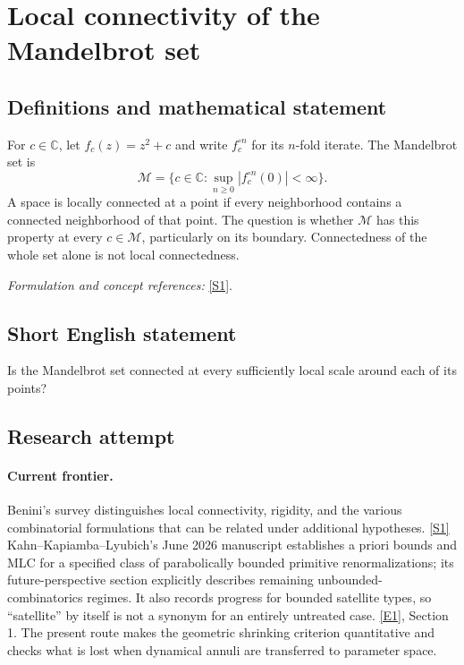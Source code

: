 \documentclass[11pt,a4paper]{article}
\newcommand{\C}{\mathbb{C}}
\newcommand{\sref}[2]{\hyperlink{source:#1:#2}{[S#2]}}
\newcommand{\eref}[2]{\hyperlink{extra:#1:#2}{[E#2]}}
\newif\ifshowcatalogue
\newcommand{\cataloguescope}[1]{\ifshowcatalogue
 \paragraph{Exact scope in the supplied catalogue.}
 \begin{quote}\small #1\end{quote}\fi}
\numberwithin{equation}{section}
\begin{document}
\setcounter{section}{0}
\clearpage
\section*{\texorpdfstring{Local connectivity of the Mandelbrot set}{Local connectivity of the Mandelbrot set}}\label{statement}
\subsection{Definitions and mathematical statement}
For $c\in\C$, let $f_c(z)=z^2+c$ and write $f_c^{\circ n}$ for its $n$-fold iterate. The Mandelbrot set is
\[
 \mathcal M=\{c\in\C:\sup_{n\ge0}|f_c^{\circ n}(0)|<\infty\}.
\]
A space is locally connected at a point if every neighborhood contains a connected neighborhood of that point. The question is whether $\mathcal M$ has this property at every $c\in\mathcal M$, particularly on its boundary. Connectedness of the whole set alone is not local connectedness.
\par\smallskip\textit{Formulation and concept references:} \sref{statement}{1}.
\cataloguescope{Determine whether the Mandelbrot set M = \{c in C : the orbit of 0 under z -> z\textasciicircum{}2 + c is bounded\} is locally connected at every point.}
\subsection{Short English statement}
Is the Mandelbrot set connected at every sufficiently local scale around each of its points?
\subsection{Research attempt}

\paragraph{Current frontier.}
Benini's survey distinguishes local connectivity, rigidity, and the
various combinatorial formulations that can be related under additional
hypotheses. \sref{statement}{1}
Kahn--Kapiamba--Lyubich's June 2026 manuscript establishes a priori
bounds and MLC for a specified class of parabolically bounded primitive
renormalizations; its future-perspective section explicitly describes
remaining unbounded-combinatorics regimes.  It also records progress for
bounded satellite types, so ``satellite'' by itself is not a synonym
for an entirely untreated case. \eref{statement}{1}, Section 1.
The present route makes the geometric shrinking criterion quantitative
and checks what is lost when dynamical annuli are transferred to
parameter space.
\end{document}
